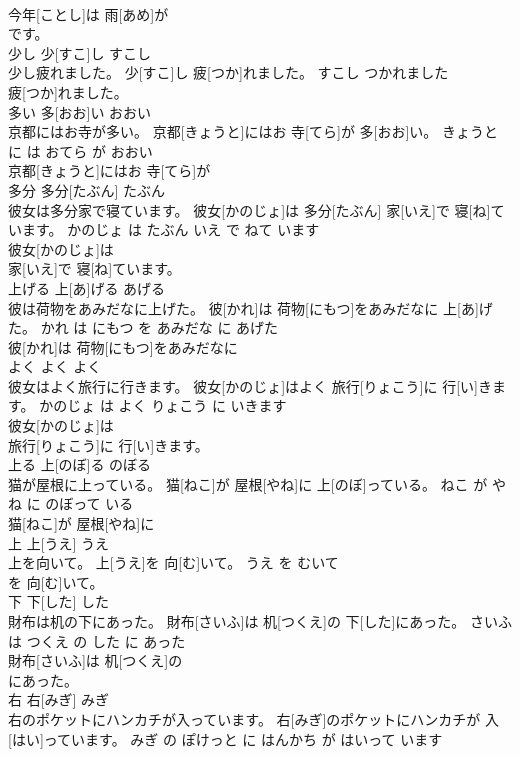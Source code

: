 \documentclass[8pt]{extreport}
\begin{document}
\begin{CJK}{UTF8}{min}
\\	今年[ことし]は 雨[あめ]が
\\	です。		
\\	少し	少[すこ]し	すこし	
\\	少し疲れました。	少[すこ]し 疲[つか]れました。	すこし つかれました	
\\	疲[つか]れました。		
\\	多い	多[おお]い	おおい	
\\	京都にはお寺が多い。	京都[きょうと]にはお 寺[てら]が 多[おお]い。	きょうと に は おてら が おおい	
\\	京都[きょうと]にはお 寺[てら]が
\\	多分	多分[たぶん]	たぶん	
\\	彼女は多分家で寝ています。	彼女[かのじょ]は 多分[たぶん] 家[いえ]で 寝[ね]ています。	かのじょ は たぶん いえ で ねて います	
\\	彼女[かのじょ]は
\\	家[いえ]で 寝[ね]ています。		
\\	上げる	上[あ]げる	あげる	
\\	彼は荷物をあみだなに上げた。	彼[かれ]は 荷物[にもつ]をあみだなに 上[あ]げた。	かれ は にもつ を あみだな に あげた	
\\	彼[かれ]は 荷物[にもつ]をあみだなに
\\	よく	よく	よく	
\\	彼女はよく旅行に行きます。	彼女[かのじょ]はよく 旅行[りょこう]に 行[い]きます。	かのじょ は よく りょこう に いきます	
\\	彼女[かのじょ]は
\\	旅行[りょこう]に 行[い]きます。		
\\	上る	上[のぼ]る	のぼる	
\\	猫が屋根に上っている。	猫[ねこ]が 屋根[やね]に 上[のぼ]っている。	ねこ が やね に のぼって いる	
\\	猫[ねこ]が 屋根[やね]に
\\	上	上[うえ]	うえ	
\\	上を向いて。	上[うえ]を 向[む]いて。	うえ を むいて	
\\	を 向[む]いて。		
\\	下	下[した]	した	
\\	財布は机の下にあった。	財布[さいふ]は 机[つくえ]の 下[した]にあった。	さいふ は つくえ の した に あった	
\\	財布[さいふ]は 机[つくえ]の
\\	にあった。		
\\	右	右[みぎ]	みぎ	
\\	右のポケットにハンカチが入っています。	右[みぎ]のポケットにハンカチが 入[はい]っています。	みぎ の ぽけっと に はんかち が はいって います	

\end{CJK}
\end{document}
